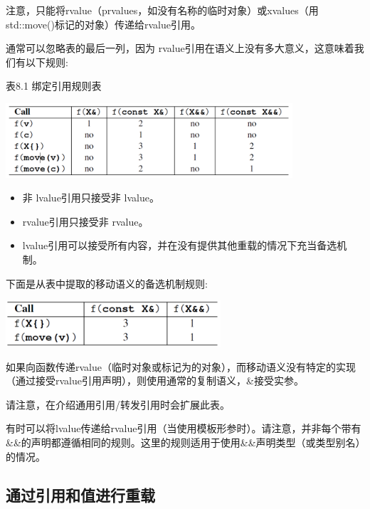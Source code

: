 注意，只能将rvalue（prvalues，如没有名称的临时对象）或xvalues（用std::move()标记的对象）传递给rvalue引用。

通常可以忽略表的最后一列，因为 rvalue引用在语义上没有多大意义，这意味着我们有以下规则:

\hspace*{\fill}  %
表8.1 绑定引用规则表

\begin{center}
	\includegraphics[width=0.8\textwidth]{part1/ch8/images/3}
\end{center}

\begin{itemize}
	\item 非 lvalue引用只接受非 lvalue。
	\item rvalue引用只接受非 rvalue。
	\item {} lvalue引用可以接受所有内容，并在没有提供其他重载的情况下充当备选机制。
\end{itemize}

下面是从表中提取的移动语义的备选机制规则:

\begin{center}
	\includegraphics[width=0.6\textwidth]{part1/ch8/images/4}
\end{center}

如果向函数传递rvalue（临时对象或标记为的对象），而移动语义没有特定的实现（通过接受rvalue引用声明），则使用通常的复制语义，\&接受实参。

请注意，在介绍通用引用/转发引用时会扩展此表。

有时可以将lvalue传递给rvalue引用（当使用模板形参时）。请注意，并非每个带有\&\&的声明都遵循相同的规则。这里的规则适用于使用\&\&声明类型（或类型别名）的情况。

\subsection{通过引用和值进行重载}

